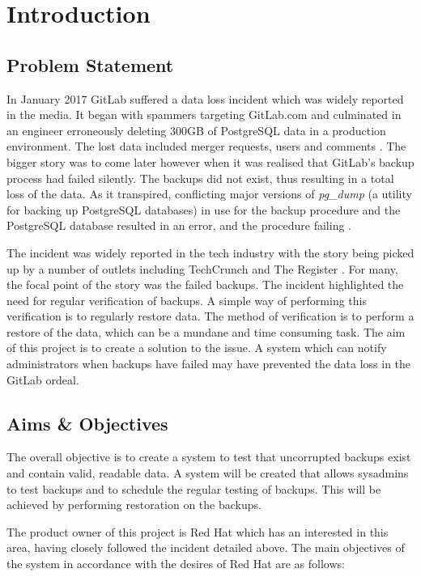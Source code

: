 \section{Introduction}

\subsection{Problem Statement}
In January 2017 GitLab suffered a data loss incident which was widely reported in the media. It began with spammers targeting GitLab.com and culminated in an engineer erroneously deleting 300GB of PostgreSQL data in a production environment. The lost data included merger requests, users and comments \citep{gitlab1}. The bigger story was to come later however when it was realised that GitLab's backup process had failed silently. The backups did not exist, thus resulting in a total loss of the data. As it transpired, conflicting major versions of \textit{pg\_dump} (a utility for backing up PostgreSQL databases) in use for the backup procedure and the PostgreSQL database resulted in an error, and the procedure failing \citep{gitlab2}.

The incident was widely reported in the tech industry with the story being picked up by a number of outlets including TechCrunch \citeyearpar{lomas} and The Register \citeyearpar{sharwood}. For many, the focal point of the story was the failed backups. The incident highlighted the need for regular verification of backups. A simple way of performing this verification is to regularly restore data. The method of verification is to perform a restore of the data, which can be a mundane and time consuming task. The aim of this project is to create a solution to the issue. A system which can notify administrators when backups have failed may have prevented the data loss in the GitLab ordeal.

\subsection{Aims \& Objectives}
The overall objective is to create a system to test that uncorrupted backups exist and contain valid, readable data. A system will be created that allows sysadmins to test backups and to schedule the regular testing of backups. This will be achieved by performing restoration on the backups.

The product owner of this project is Red Hat which has an interested in this area, having closely followed the incident detailed above. The main objectives of the system in accordance with the desires of Red Hat are as follows:

